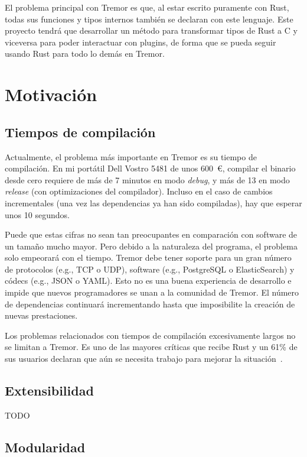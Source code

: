 El problema principal con Tremor es que, al estar escrito puramente con Rust,
todas sus funciones y tipos internos también se declaran con este lenguaje. Este
proyecto tendrá que desarrollar un método para transformar tipos de Rust a C y
viceversa para poder interactuar con plugins, de forma que se pueda seguir
usando Rust para todo lo demás en Tremor.

\section{Motivación}

\subsection{Tiempos de compilación}

Actualmente, el problema más importante en Tremor es su tiempo de compilación.
En mi portátil Dell Vostro 5481 de unos 600~€, compilar el binario 
desde cero requiere de más de 7 minutos en modo \emph{debug}, y más de 13 en
modo \emph{release} (con optimizaciones del compilador). Incluso en el caso de
cambios incrementales (una vez las dependencias ya han sido compiladas), hay que
esperar unos 10 segundos.

Puede que estas cifras no sean tan preocupantes en comparación con software de
un tamaño mucho mayor. Pero debido a la naturaleza del programa, el problema
solo empeorará con el tiempo. Tremor debe tener soporte para un gran número de
protocolos (e.g., TCP o UDP), software (e.g., PostgreSQL o ElasticSearch) y
códecs (e.g., JSON o YAML). Esto no es una buena experiencia de desarrollo e
impide que nuevos programadores se unan a la comunidad de Tremor. El número de
dependencias continuará incrementando hasta que imposibilite la creación de
nuevas prestaciones.

Los problemas relacionados con tiempos de compilación excesivamente largos no se
limitan a Tremor. Es uno de las mayores críticas que recibe Rust y un 61\% de
sus usuarios declaran que aún se necesita trabajo para mejorar la
situación~\cite{rustsurvey}.

\subsection{Extensibilidad}

TODO

\subsection{Modularidad}

